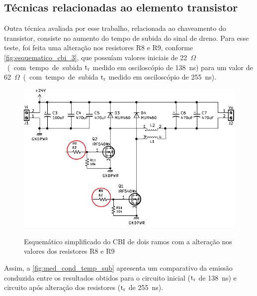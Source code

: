     \subsection{Técnicas relacionadas ao elemento transistor} \label{cap:result_tecnicas_chaveam}
    
    Outra técnica avaliada por esse trabalho, relacionada ao chaveamento do transistor, consiste no aumento do tempo de subida do sinal de dreno. Para esse teste, foi feita uma alteração nos resistores R8 e R9, conforme \autoref{fig:esquematico_cbi_3}, que possuíam valores iniciais de \qty{22}{$\Omega$} (com tempo de subida $\text{t}_\text{r}$ medido em osciloscópio de \qty{138}{\nano\second}) para um valor de \qty{62}{$\Omega$} (com tempo de subida $\text{t}_\text{r}$ medido em osciloscópio de \qty{255}{\nano\second}). 
    
    \begin{figure}[H]
    	\centering
    	\caption{Esquemático simplificado do CBI de dois ramos com a alteração nos valores dos resistores R8 e R9}
    	\includegraphics[scale=1.2]{pdf/layout/Esquematico_CBI_tr.pdf}
        \label{fig:esquematico_cbi_3}
    \end{figure}
    
    Assim, a \autoref{fig:med_cond_temp_sub} apresenta um comparativo da emissão conduzida entre os resultados obtidos para o circuito inicial ($\text{t}_\text{r}$ de \qty{138}{\nano\second}) e circuito após alteração dos resistores ($\text{t}_\text{r}$ de \qty{255}{\nano\second}). 
    
